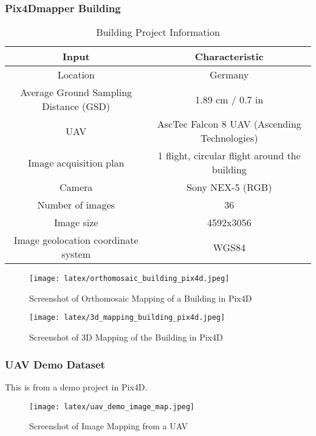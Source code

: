 \documentclass[11pt,twocolumn,letterpaper]{article}
\begin{document}
\subsubsection{Pix4Dmapper Building}
\begin{table}[H]
\begin{adjustbox}{max width=230pt,max height=200cm}
 \begin{tabular}{||c | c||} 
 \hline
 Input & Characteristic  \\ [0.5ex] 
 \hline\hline
 Location & Germany \\ 
 \hline
 Average Ground Sampling Distance (GSD) & 1.89 cm / 0.7 in  \\
 \hline
 UAV & AscTec Falcon 8 UAV (Ascending Technologies)  \\
 \hline
 Image acquisition plan & 1 flight, circular flight around the building \\
 \hline
 Camera & Sony NEX-5 (RGB)  \\ 
 \hline
 Number of images & 36  \\
 \hline
 Image size	 & 4592x3056 \\
 \hline
 Image geolocation coordinate system & WGS84 \\ [1ex] 
 \hline

\end{tabular}
\end{adjustbox}
  \caption{Building Project Information}
\end{table}

\begin{figure}[H]
\centering
    \texttt{[image: latex/orthomosaic\_building\_pix4d.jpeg]}
\caption{Screenshot of Orthomosaic Mapping of a Building in Pix4D }
\label{fig:1}
\end{figure}

\begin{figure}[H]
\centering
    \texttt{[image: latex/3d\_mapping\_building\_pix4d.jpeg]}
\caption{Screenshot of 3D Mapping of the Building in Pix4D }
\label{fig:2}
\end{figure}





\subsubsection{UAV Demo Dataset}

This is from a demo project in Pix4D.

\begin{figure}[!htbp]
\centering
    \texttt{[image: latex/uav\_demo\_image\_map.jpeg]}
\caption{Screenshot of Image Mapping from a UAV }
\label{fig:3}
\end{figure}
\end{document}

